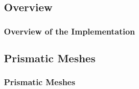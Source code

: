 \subsection{Overview}

\begin{frame}
    \frametitle{Overview of the Implementation}

    
\end{frame}

\subsection{Prismatic Meshes}

\begin{frame}
    \frametitle{Prismatic Meshes}

    
\end{frame}

